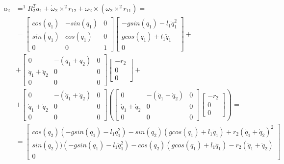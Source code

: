 \documentclass[a4paper,14pt]{extreport}
\begin{document}
\begin{itemize}
\begin{align*}
a_2 &= ^1R_2^T a_1 + \dot \omega_2 \times ^2r_{12} + \omega_2 \times (\omega_2 \times ^2r_{11}) = \\
&=
\begin{bmatrix}
cos(q_1) & -sin(q_1) & 0\\
sin(q_1)& cos(q_1) &0\\
0&0 &1
\end{bmatrix}
\begin{bmatrix}
-g sin(q_1) - l_1 \ddot q_1^2\\
g cos(q_1) + l_1 \ddot q_1\\
0
\end{bmatrix}
+\\
&+
\begin{bmatrix}
0 & -(\ddot q_1 + \ddot q_2) & 0\\
\ddot q_1 + \ddot q_2 & 0 & 0\\
0 & 0 & 0
\end{bmatrix}
\begin{bmatrix}
-r_2\\
0\\
0
\end{bmatrix}
+\\
&+
\begin{bmatrix}
0 & -(\dot q_1 + \dot q_2) & 0\\
\dot q_1 + \dot q_2 & 0 & 0\\
0 & 0 & 0
\end{bmatrix}
\left(
\begin{bmatrix}
0 & -(\dot q_1 + \dot q_2) & 0\\
\dot q_1 + \dot q_2 & 0 & 0\\
0 & 0 & 0
\end{bmatrix}
\begin{bmatrix}
-r_2\\
0\\
0
\end{bmatrix}
\right)
=\\
&=
\begin{bmatrix}
cos(q_2) (-g sin(q_1) - l_1 \ddot q_1^2) - sin(q_2) (g cos(q_1) + l_1 \ddot q_1) + r_2 (\dot q_1 + \dot q_2)^2\\
sin(q_2) ) (-g sin(q_1) - l_1 \ddot q_1^2) - cos(q_2) (g cos(q_1) + l_1 \ddot q_1) - r_2 (\ddot q_1 + \ddot q_2)\\
0
\end{bmatrix}
\end{align*}



\end{itemize}
\end{document}
